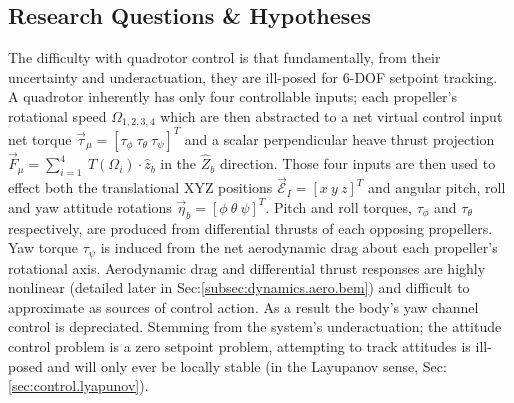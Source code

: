 \subsection{Research Questions \& Hypotheses}
\label{subsec:intro.foreword.hypotheses}
The difficulty with quadrotor control is that fundamentally, from their uncertainty and underactuation, they are ill-posed for 6-DOF setpoint tracking. A quadrotor inherently has only four controllable inputs; each propeller's rotational speed $\Omega_{1,2,3,4}$ which are then abstracted to a net virtual control input net torque $\vec{\tau}_\mu=[\tau_{\phi}~\tau_{\theta}~\tau_{\psi}]^T$ and a scalar perpendicular heave thrust projection $\vec{F}_\mu=\sum_{i=1}^{4}~T(\Omega_i)\cdot\hat{z}_b$ in the $\hat{Z}_b$ direction. Those four inputs are then used to effect both the translational XYZ positions $\vec{\mathcal{E}}_I=[x~y~z]^T$ and angular pitch, roll and yaw attitude rotations $\vec{\eta}_b=[\phi~\theta~\psi]^T$. Pitch and roll torques, $\tau_{\phi}$ and $\tau_{\theta}$ respectively, are produced from differential thrusts of each opposing propellers. Yaw torque $\tau_{\psi}$ is induced from the net aerodynamic drag about each propeller's rotational axis. Aerodynamic drag and differential thrust responses are highly nonlinear (detailed later in Sec:\ref{subsec:dynamics.aero.bem}) and difficult to approximate as sources of control action. As a result the body's yaw channel control is depreciated. Stemming from the system's underactuation; the attitude control problem is a zero setpoint problem, attempting to track attitudes is ill-posed and will only ever be locally stable (in the Layupanov sense, Sec:\ref{sec:control.lyapunov}).
\par

